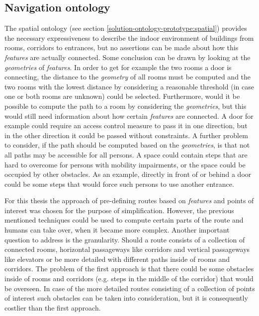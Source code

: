 \documentclass[draft,final]{vutinfth} %
\begin{document}
\subsection{Navigation ontology}
\label{solution-ontology-prototype:navigation}
The spatial ontology (see section \ref{solution-ontology-prototype:spatial}) provides the necessary expressiveness to describe the indoor environment of buildings from rooms, corridors to entrances, but no assertions can be made about how this \textit{features} are actually connected. Some conclusion can be drawn by looking at the \textit{geometries} of \textit{features}. In order to get for example the two rooms a door is connecting, the distance to the \textit{geometry} of all rooms must be computed and the two rooms with the lowest distance by considering a reasonable threshold (in case one or both rooms are unknown) could be selected. Furthermore, would it be possible to compute the path to a room by considering the \textit{geometries}, but this would still need information about how certain \textit{features} are connected. A door for example could require an access control measure to pass it in one direction, but in the other direction it could be passed without constraints. A further problem to consider, if the path should be computed based on the \textit{geometries}, is that not all paths may be accessible for all persons. A space could contain steps that are hard to overcome for persons with mobility impairments, or the space could be occupied by other obstacles.  As an example, directly in front of or behind a door could be some steps that would force such persons to use another entrance.

For this thesis the approach of pre-defining routes based on \textit{features} and points of interest was chosen for the purpose of simplification. However, the previous mentioned techniques could be used to compute certain parts of the route and humans can take over, when it became more complex. Another important question to address is the granularity. Should a route consists of a collection of connected rooms, horizontal passageways like corridors and vertical passageways like elevators or be more detailed with different paths inside of rooms and corridors. The problem of the first approach is that there could be some obstacles inside of rooms and corridors (e.g. steps in the middle of the corridor) that would be overseen. In case of the more detailed routes consisting of a collection of points of interest such obstacles can be taken into consideration, but it is consequently costlier than the first approach.
\end{document}
